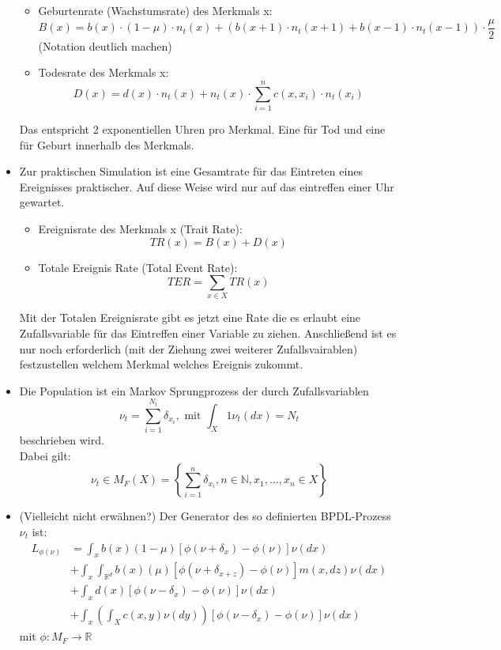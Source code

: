 \documentclass{article}
\begin{document}
\begin{itemize}
\begin{itemize}
				\item Geburtenrate (Wachstumsrate) des Merkmals x: \[ B(x) = b(x) \cdot (1 - \mu) \cdot n_t(x) + (b(x+1)\cdot n_t(x+1) + b(x-1)\cdot n_t(x-1)) \cdot \frac{\mu}{2} \]
				(Notation deutlich machen)
				\item Todesrate des Merkmals x: 
				\[ D(x) = d(x) \cdot n_t(x) + n_t(x) \cdot \sum_{i=1}^{n} c(x,x_i) \cdot n_t(x_i) \]
			\end{itemize}
			Das entspricht 2 exponentiellen Uhren pro Merkmal. Eine für Tod und eine für Geburt innerhalb des Merkmals.
			\item Zur praktischen Simulation ist eine Gesamtrate für das Eintreten eines Ereignisses praktischer. Auf diese Weise wird nur auf das eintreffen einer Uhr gewartet.
			\begin{itemize}
				\item Ereignisrate des Merkmals x (Trait Rate):
					\[ TR(x) = B(x) + D(x) \]
				\item Totale Ereignis Rate (Total Event Rate): 
				\[ TER = \sum_{x \in X} TR(x)\]
			\end{itemize}
			Mit der Totalen Ereignisrate gibt es jetzt eine Rate die es erlaubt eine Zufallsvariable für das Eintreffen einer Variable zu ziehen. Anschließend ist es nur noch erforderlich (mit der Ziehung zwei weiterer Zufallsvairablen) festzustellen welchem Merkmal welches Ereignis zukommt.
			\item Die Population ist ein Markov Sprungprozess der durch Zufallsvariablen
			\[ \nu_t = \sum_{i=1}^{N_t} \delta_{x_i}, \text{ mit } \int_X 1\nu_t(dx) = N_t \]
			beschrieben wird.\\
			Dabei gilt: \[ \nu_t \in M_F(X) = \left\{ \sum_{i=1}^{n} \delta_{x_i}, n \in \mathbb{N}, x_1, \dots, x_n \in X \right\} \]
			\item (Vielleicht nicht erwähnen?) Der Generator des so definierten BPDL-Prozess $ \nu_t $ ist:
			\begin{align}
				L_{\phi(\nu)} &= \int_{x} b(x)(1-\mu)[\phi(\nu + \delta_x) - \phi(\nu)]\nu(dx)\\
							&+ \int_{x}\int_{\mathbb{R}^d} b(x)(\mu)[\phi(\nu + \delta_{x+z}) - \phi(\nu)] m(x,dz) \nu(dx)\\
							&+ \int_{x} d(x)[\phi(\nu - \delta_x) - \phi(\nu)]\nu(dx)\\
							&+ \int_{x} \left( \int_{X} c(x,y) \nu(dy) \right) [\phi(\nu - \delta_x) - \phi(\nu)]\nu(dx)
			\end{align}
			mit $ \phi: M_F \to \mathbb{R} $
		\end{itemize}
\end{document}
